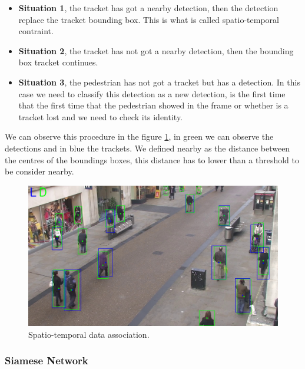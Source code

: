 \documentclass[12pt, a4paper, titlepage,twoside,openright]{article}
\begin{document}
\begin{itemize}



\item \textbf{Situation 1}, the tracket has got a nearby detection, then the detection replace the tracket bounding box. This is what is called spatio-temporal contraint.

\item \textbf{Situation 2}, the tracket has not got a nearby detection, then the bounding box tracket continues.

\item \textbf{Situation 3}, the pedestrian has not got a tracket but has a detection. In this case we need to classify this detection as a new detection, is the first time that the first time that the pedestrian showed in the frame or whether is a tracket lost and we need to check its identity.

\end{itemize}

We can observe this procedure in the figure \ref{data1}, in green we can observe the detections and in blue the trackets. We defined nearby as the distance between the centres of the boundings boxes, this distance has to lower than a threshold to be consider nearby. 

\begin{figure}[hptb]
\centering         
\includegraphics[width=12cm]{lucasKanade/dataAssociation.jpg}
\caption{Spatio-temporal data association.} \label{data1}
\end{figure}







\subsubsection{Siamese Network}
\end{document}
